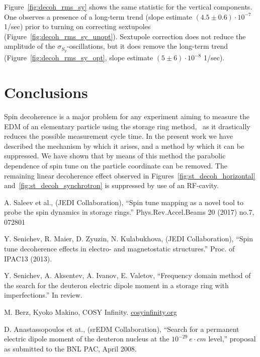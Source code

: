 \documentclass[a4paper]{jacow}
\begin{document}
Figure~\ref{fig:decoh_rms_sy} shows the same statistic for the vertical components. One observes a presence of a long-term trend (slope estimate $(4.5 \pm 0.6)\cdot 10^{-7}$ 1/sec) prior to turning on correcting sextupoles (Figure~\ref{fig:decoh_rms_sy_unopt}). Sextupole correction does not reduce the amplitude of the $\sigma_{S_y}$-oscillations, but it does remove the long-term trend (Figure~\ref{fig:decoh_rms_sy_opt}, slope estimate $(5 \pm 6) \cdot 10^{-8}$ 1/sec).

\section{Conclusions}
Spin decoherence is a major problem for any experiment aiming to measure the EDM of an elementary particle using the storage ring method,~\cite{BNL:Deuteron2008} as it drastically reduces the possible measurement cycle time. In the present work we have described the mechanism by which it arises, and a method by which it can be suppressed. We have shown that by means of this method the parabolic dependence of spin tune on the particle coordinate can be removed. The remaining linear decoherence effect observed in Figures~\ref{fig:st_decoh_horizontal} and~\ref{fig:st_decoh_synchrotron} is suppressed by use of an RF-cavity.

\begin{thebibliography}{9}
  
  A. Saleev et al., (JEDI Collaboration), ``Spin tune mapping as a novel tool to probe the spin dynamics in storage rings.'' Phys.Rev.Accel.Beams 20 (2017) no.7, 072801

  Y. Senichev, R. Maier, D. Zyuzin, N. Kulabukhova, (JEDI Collaboration), ``Spin tune decoherence effects in electro- and magnetostatic structures.'' Proc. of IPAC13 (2013).

  Y. Senichev, A. Aksentev, A. Ivanov, E. Valetov, ``Frequency domain method of the search for the deuteron electric dipole moment in a storage ring with imperfections.'' In review.

  M. Berz, Kyoko Makino, COSY Infinity. \url{cosyinfinity.org}

  D. Anastassopoulos et at., (srEDM Collaboration), ``Search for a permanent electric dipole moment of the deuteron nucleus at the $10^{-29}~e\cdot cm$ level,'' proposal as submitted to the BNL PAC, April 2008.
  
\end{thebibliography}
\end{document}
